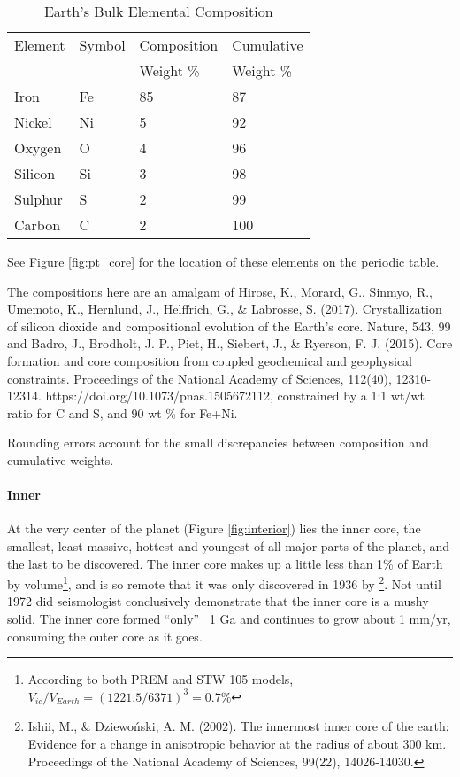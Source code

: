 \begin{table} 
\centering
\begin{threeparttable}
\caption{Earth's Bulk Elemental Composition}
\label{tab:ebc}
\begin{tabular}{@{}llll@{}} \toprule
Element	  &Symbol		&Composition\tnote{2}	&Cumulative\tnote{3}\\
      	  &	        &Weight \%		&Weight \% \\ \midrule
Iron		  &Fe				&85						&87\\
Nickel		&Ni			  &5		  			&92\\
Oxygen		&O		    &4		        &96\\
Silicon		&Si		    &3		        &98\\
Sulphur		&S		    &2	          &99\\
Carbon		&C		    &2	          &100\\ \bottomrule
\end{tabular}
\begin{tablenotes}
\item[1] See Figure \ref{fig:pt_core} for the location of these elements on the periodic table.
\item[2] The compositions here are an amalgam of Hirose, K., Morard, G., Sinmyo, R., Umemoto, K., Hernlund, J., Helffrich, G., \& Labrosse, S. (2017). Crystallization of silicon dioxide and compositional evolution of the Earth's core. Nature, 543, 99 and Badro, J., Brodholt, J. P., Piet, H., Siebert, J., \& Ryerson, F. J. (2015). Core formation and core composition from coupled geochemical and geophysical constraints. Proceedings of the National Academy of Sciences, 112(40), 12310-12314. https://doi.org/10.1073/pnas.1505672112, constrained by a 1:1 wt/wt ratio for C and S, and 90 wt \% for Fe+Ni.  
\item[3] Rounding errors account for the small discrepancies between composition and cumulative weights. 
\end{tablenotes}
\end{threeparttable}
\end{table}

\paragraph{Inner}
At the very center of the planet (Figure \ref{fig:interior}) lies the inner core, the smallest, least massive, hottest and youngest of all major parts of the planet, and the last to be discovered. The inner core makes up a little less than 1\% of Earth by volume\footnote{According to both PREM and STW 105 models, $V_{ic}/V_{Earth}=(1221.5/6371)^3=0.7\%$}, and is so remote that it was only discovered in 1936 by \footnote{Ishii, M., \& Dziewo\'{n}ski, A. M. (2002). The innermost inner core of the earth: Evidence for a change in anisotropic behavior at the radius of about 300 km. Proceedings of the National Academy of Sciences, 99(22), 14026-14030.}. Not until 1972 did seismologist conclusively demonstrate that the inner core is a mushy solid. The inner core formed ``only'' ~1 Ga and continues to grow about 1 mm/yr, consuming the outer core as it goes. 


